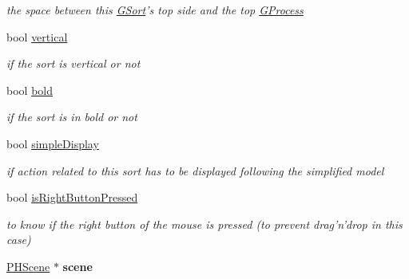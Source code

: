 \begin{DoxyCompactItemize}
\begin{DoxyCompactList}\small\item\em the space between this \hyperlink{classGSort}{G\+Sort}'s top side and the top \hyperlink{classGProcess}{G\+Process} \end{DoxyCompactList}\item 
\hypertarget{classGSort_ab420d44edd3759c7afbc30fb9d6e9f4f}{bool \hyperlink{classGSort_ab420d44edd3759c7afbc30fb9d6e9f4f}{vertical}}\label{classGSort_ab420d44edd3759c7afbc30fb9d6e9f4f}

\begin{DoxyCompactList}\small\item\em if the sort is vertical or not \end{DoxyCompactList}\item 
\hypertarget{classGSort_a58c1714d20b3eb4bec30b2989cef4a1b}{bool \hyperlink{classGSort_a58c1714d20b3eb4bec30b2989cef4a1b}{bold}}\label{classGSort_a58c1714d20b3eb4bec30b2989cef4a1b}

\begin{DoxyCompactList}\small\item\em if the sort is in bold or not \end{DoxyCompactList}\item 
\hypertarget{classGSort_ac8cb95ac18d2382bf37feb664c885175}{bool \hyperlink{classGSort_ac8cb95ac18d2382bf37feb664c885175}{simple\+Display}}\label{classGSort_ac8cb95ac18d2382bf37feb664c885175}

\begin{DoxyCompactList}\small\item\em if action related to this sort has to be displayed following the simplified model \end{DoxyCompactList}\item 
\hypertarget{classGSort_a7d2304aa3500975d1ecb4480c5d15267}{bool \hyperlink{classGSort_a7d2304aa3500975d1ecb4480c5d15267}{is\+Right\+Button\+Pressed}}\label{classGSort_a7d2304aa3500975d1ecb4480c5d15267}

\begin{DoxyCompactList}\small\item\em to know if the right button of the mouse is pressed (to prevent drag'n'drop in this case) \end{DoxyCompactList}\item 
\hypertarget{classGSort_a35c5f76dda2b7eca466101888f5d4a20}{\hyperlink{classPHScene}{P\+H\+Scene} $\ast$ {\bfseries scene}}\label{classGSort_a35c5f76dda2b7eca466101888f5d4a20}

\end{DoxyCompactItemize}
